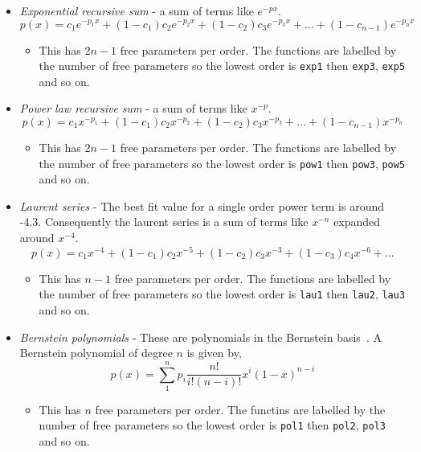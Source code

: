 \begin{itemize}
  \item \textit{Exponential recursive sum} - a sum of terms like $e^{-px}$.
    \begin{equation}
      p(x) = c_{1}e^{-p_{1}x} + (1-c_{1})c_{2}e^{-p_{2}x} + (1-c_{2})c_{3}e^{-p_{3}x} + ... + (1-c_{n-1})e^{-p_{n}x}
    \end{equation}
    \begin{itemize}
      \item This has $2n-1$ free parameters per order. The functions are labelled by the number of free parameters so the lowest order is \texttt{exp1} then \texttt{exp3}, \texttt{exp5} and so on.
    \end{itemize}

  \item \textit{Power law recursive sum} - a sum of terms like $x^{-p}$.
    \begin{equation}
      p(x) = c_{1}x^{-p_{1}} + (1-c_{1})c_{2}x^{-p_{2}} + (1-c_{2})c_{3}x^{-p_{3}} + ... + (1-c_{n-1})x^{-p_{n}}
    \end{equation}
    \begin{itemize}
      \item This has $2n-1$ free parameters per order. The functions are labelled by the number of free parameters so the lowest order is \texttt{pow1} then \texttt{pow3}, \texttt{pow5} and so on.
    \end{itemize}

  \item \textit{Laurent series} - The best fit value for a single order power term is around -4.3. Consequently the laurent series is a sum of terms like $x^{-n}$ expanded around $x^{-4}$.
    \begin{equation}
      p(x) = c_{1}x^{-4} + (1-c_{1})c_{2}x^{-5} + (1-c_{2})c_{3}x^{-3} + (1-c_{3})c_{4}x^{-6} + ...
    \end{equation}
    \begin{itemize}
      \item This has $n-1$ free parameters per order. The functions are labelled by the number of free parameters so the lowest order is \texttt{lau1} then \texttt{lau2}, \texttt{lau3} and so on.
    \end{itemize}

  \item \textit{Bernstein polynomials} - These are polynomials in the Bernstein basis~\cite{bernsteins1,bernsteins2}. A Bernstein polynomial of degree $n$ is given by,
  \begin{equation}
    p(x) = \displaystyle\sum_{1}^{n}p_{i}\frac{n!}{i!(n-i)!}x^{i}(1-x)^{n-i}
  \end{equation}
  \begin{itemize}
    \item This has $n$ free parameters per order. The functins are labelled by the number of free parameters so the lowest order is \texttt{pol1} then \texttt{pol2}, \texttt{pol3} and so on.
  \end{itemize}
\end{itemize}

